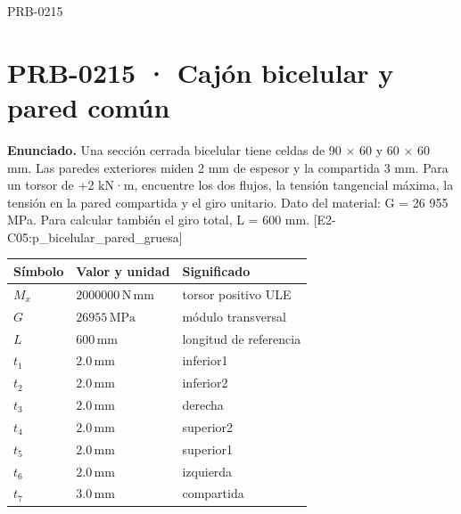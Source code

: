 \begin{studiumworked}{PRB-0215}

\section{PRB-0215 · Cajón bicelular y pared común}

\textbf{Enunciado.} Una sección cerrada bicelular tiene celdas de 90 \ensuremath{\times} 60 y 60 \ensuremath{\times} 60 mm. Las paredes exteriores miden 2 mm de espesor y la compartida 3 mm. Para un torsor de +2 kN·m, encuentre los dos flujos, la tensión tangencial máxima, la tensión en la pared compartida y el giro unitario. Dato del material: G = 26 955 MPa. Para calcular también el giro total, L = 600 mm. [E2-C05:p\_bicelular\_pared\_gruesa]

\par\medskip\noindent\begin{tabular}{@{}p{.18\linewidth}p{.26\linewidth}p{.48\linewidth}@{}}
\toprule Símbolo & Valor y unidad & Significado\\\midrule
$M_{x}$ & $2000000\,\mathrm{N\,mm}$ & torsor positivo ULE\\
$G$ & $26955\,\mathrm{MPa}$ & módulo transversal\\
$L$ & $600\,\mathrm{mm}$ & longitud de referencia\\
$t_{1}$ & $2.0\,\mathrm{mm}$ & inferior1\\
$t_{2}$ & $2.0\,\mathrm{mm}$ & inferior2\\
$t_{3}$ & $2.0\,\mathrm{mm}$ & derecha\\
$t_{4}$ & $2.0\,\mathrm{mm}$ & superior2\\
$t_{5}$ & $2.0\,\mathrm{mm}$ & superior1\\
$t_{6}$ & $2.0\,\mathrm{mm}$ & izquierda\\
$t_{7}$ & $3.0\,\mathrm{mm}$ & compartida\\
\bottomrule\end{tabular}\par\medskip


\end{studiumworked}
